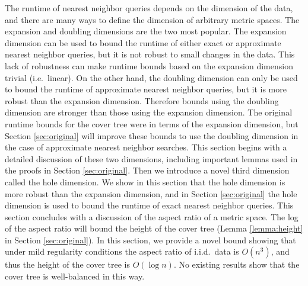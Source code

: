 \documentclass[thesis.tex]{subfiles}
\newcommand{\aspect}[1]{\Delta_{#1}}
\newcommand{\cdoub}{c_\textnormal{doub}}
\newcommand{\chole}{c_\textnormal{hole}}
\begin{document}
The runtime of nearest neighbor queries depends on the dimension of the data,
and there are many ways to define the dimension of arbitrary metric spaces.
The expansion and doubling dimensions are the two most popular. 
The expansion dimension can be used to bound the runtime of either exact or approximate nearest neighbor queries,
but it is not robust to small changes in the data.
This lack of robustness can make runtime bounds based on the expansion dimension trivial 
(i.e.\ linear).
On the other hand, 
the doubling dimension can only be used to bound the runtime of approximate nearest neighbor queries,
but it is more robust than the expansion dimension.
Therefore bounds using the doubling dimension are stronger than those using the expansion dimension.
The original runtime bounds for the cover tree were in terms of the expansion dimension,
but Section \ref{sec:original} will improve these bounds to use the doubling dimension in the case of approximate nearest neighbor searches.
This section begins with a detailed discussion of these two dimensions, 
including important lemmas used in the proofs in Section \ref{sec:original}.
Then we introduce a novel third dimension called the hole dimension.
We show in this section that the hole dimension is more robust than the expansion dimension,
and in Section \ref{sec:original} the hole dimension is used to bound the runtime of exact nearest neighbor queries.
This section concludes with a discussion of the aspect ratio of a metric space.
The log of the aspect ratio will bound the height of the cover tree (Lemma \ref{lemma:height} in Section \ref{sec:original}).
In this section, we provide a novel bound showing that under mild regularity conditions the aspect ratio of i.i.d.\ data is $O(n^3)$, 
and thus the height of the cover tree is $O(\log n)$.
No existing results show that the cover tree is well-balanced in this way.

\end{document}
